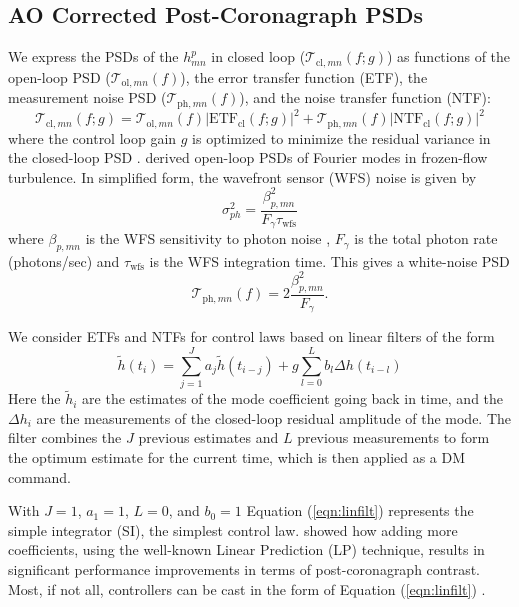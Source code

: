 \documentclass[11pt,preprint]{aastex}
\begin{document}
\subsection{AO Corrected Post-Coronagraph PSDs}

We express the PSDs of the $h_{mn}^p$ in closed loop ($\mathcal{T}_{\mathrm{cl},mn}(f;g)$) as functions of the open-loop PSD ($\mathcal{T}_{\mathrm{ol},mn}(f)$), the error transfer function (ETF), the measurement noise PSD ($\mathcal{T}_{\mathrm{ph},mn}(f)$), and the noise transfer function (NTF): 
\begin{equation}
\mathcal{T}_{\mathrm{cl},mn}(f;g) = \mathcal{T}_{\mathrm{ol},mn}(f) \left| \mbox{ETF}_{\mathrm{cl}}(f;g) \right|^2 + \mathcal{T}_{\mathrm{ph},mn}(f) \left| \mbox{NTF}_{\mathrm{cl}}(f;g) \right|^2 
\label{eqn:cl_psd}
\end{equation}
where the control loop gain $g$ is optimized to minimize the residual variance in the closed-loop PSD \citep{1999aoa..book.....R_ch6,2016ApOpt..55..323P}. \citet{2018JATIS...4a9001M} derived open-loop PSDs of Fourier modes in frozen-flow turbulence.  In simplified form, the wavefront sensor (WFS) noise is given by
\begin{equation}
\sigma_{ph}^2 = \frac{\beta_{p,mn}^2}{F_\gamma \tau_\mathrm{wfs}}
\label{eqn:photon_noise}
\end{equation}
where $\beta_{p,mn}$ is the WFS sensitivity to photon noise \citep{2005ApJ...629..592G}, $F_\gamma$ is the total photon rate (photons/sec) and $\tau_\mathrm{wfs}$ is the WFS integration time.  This gives a white-noise PSD
\begin{equation}
\mathcal{T}_{\mathrm{ph},mn}(f) = 2\frac{\beta_{p,mn}^2}{F_\gamma }.
\end{equation}


We consider ETFs and NTFs for control laws based on linear filters of the form
\begin{equation}
\widetilde{h} (t_i) = \sum_{j=1}^J a_j \widetilde{h}(t_{i-j}) + g\sum_{l=0}^L b_l \Delta h (t_{i-l})  
\label{eqn:linfilt}
\end{equation}
Here the $\widetilde{h}_i$ are the estimates of the mode coefficient going back in time, and  the $\Delta h_i$ are the measurements of the closed-loop residual amplitude of the mode.  The filter combines the $J$ previous estimates and $L$ previous measurements to form the optimum estimate for the current time, which is then applied as a DM command.  

With $J=1$, $a_1 = 1$, $L=0$, and $b_0 = 1$ Equation (\ref{eqn:linfilt}) represents the simple integrator (SI), the simplest control law.  \citet{2018JATIS...4a9001M} showed how adding more coefficients, using the well-known Linear Prediction (LP) technique, results in significant performance improvements in terms of post-coronagraph contrast.  Most, if not all, controllers can be cast in the form of Equation (\ref{eqn:linfilt}) \citep{2007JOSAA..24.2645P}. 
\end{document}
